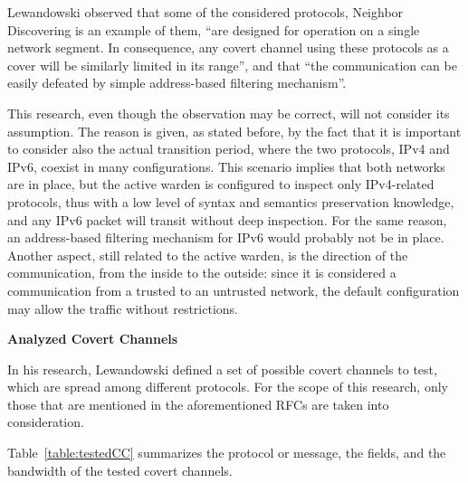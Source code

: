 \documentclass[12pt]{article}
\begin{document}
Lewandowski observed that some of the considered protocols, Neighbor Discovering is an example of them, ``are designed for operation on a single network segment. In consequence, any covert channel using these protocols as a cover will be similarly limited in its range'', and that ``the communication can be easily defeated by simple address-based filtering mechanism''\cite{lewandowski}.

This research, even though the observation may be correct, will not consider its assumption. The reason is given, as stated before, by the fact that it is important to consider also the actual transition period, where the two protocols, IPv4 and IPv6, coexist in many configurations. This scenario implies that both networks are in place, but the active warden is configured to inspect only IPv4-related protocols, thus with a low level of syntax and semantics preservation knowledge, and any IPv6 packet will transit without deep inspection. For the same reason, an address-based filtering mechanism for IPv6 would probably not be in place. Another aspect, still related to the active warden, is the direction of the communication, from the inside to the outside: since it is considered a communication from a trusted to an untrusted network, the default configuration may allow the traffic without restrictions.


\textbf{Analyzed Covert Channels}

In his research, Lewandowski defined a set of possible covert channels to test, which are spread among different protocols. For the scope of this research, only those that are mentioned in the aforementioned RFCs are taken into consideration.

Table~\ref{table:testedCC} summarizes the protocol or message, the fields, and the bandwidth of the tested covert channels.
\end{document}
